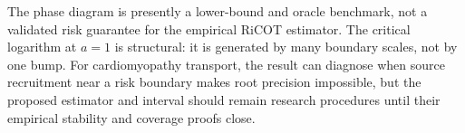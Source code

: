 The phase diagram is presently a lower-bound and oracle benchmark, not a validated risk guarantee for the empirical RiCOT estimator. The critical logarithm at \(a=1\) is structural: it is generated by many boundary scales, not by one bump. For cardiomyopathy transport, the result can diagnose when source recruitment near a risk boundary makes root precision impossible, but the proposed estimator and interval should remain research procedures until their empirical stability and coverage proofs close.